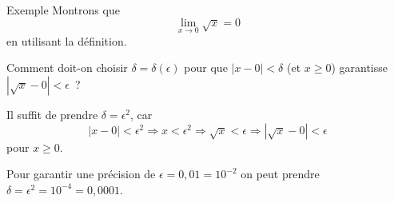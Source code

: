 \begin{frame}{Exemple}
    Montrons que
    \begin{equation*}
      \lim_{x \to 0} \sqrt{x} = 0
    \end{equation*}
    en utilisant la définition.

    \begin{question}
      Comment doit-on choisir $\delta = \delta(\epsilon)$ pour que $|x - 0| < \delta$ (et \(x \geq 0\)) garantisse $|\sqrt{x}-0| < \epsilon$~?
    \end{question}
    \begin{answer}
      Il suffit de prendre $\delta = \epsilon^2$, car
      \begin{equation*}
        |x - 0| < \epsilon^2 \Longrightarrow 
        x < \epsilon^2 \Longrightarrow
        \sqrt{x} < \epsilon \Longrightarrow
        |\sqrt{x} - 0| < \epsilon
      \end{equation*}
      pour $x \geqslant 0$.
    \end{answer}

    Pour garantir une précision de $\epsilon = 0,01 = 10^{-2}$ on peut prendre $\delta = \epsilon^2 = 10^{-4} = 0,0001$.
\end{frame}

